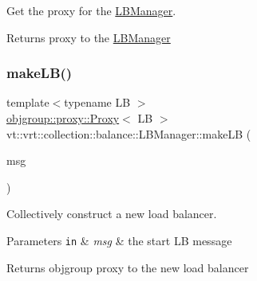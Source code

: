 Get the proxy for the \hyperlink{structvt_1_1vrt_1_1collection_1_1balance_1_1_l_b_manager}{L\+B\+Manager}. 

\begin{DoxyReturn}{Returns}
proxy to the {\ttfamily \hyperlink{structvt_1_1vrt_1_1collection_1_1balance_1_1_l_b_manager}{L\+B\+Manager}} 
\end{DoxyReturn}
\mbox{\label{structvt_1_1vrt_1_1collection_1_1balance_1_1_l_b_manager_abccd80f12ce1ced9e22f32f886a9acf6}} 
\subsubsection{\texorpdfstring{make\+L\+B()}{makeLB()}}
{\footnotesize\ttfamily template$<$typename LB $>$ \\
\hyperlink{structvt_1_1objgroup_1_1proxy_1_1_proxy}{objgroup\+::proxy\+::\+Proxy}$<$ LB $>$ vt\+::vrt\+::collection\+::balance\+::\+L\+B\+Manager\+::make\+LB (\begin{DoxyParamCaption}\item[{\hyperlink{namespacevt_ab2b3d506ec8e8d1540aede826d84a239}{Msg\+Shared\+Ptr}$<$ \hyperlink{structvt_1_1vrt_1_1collection_1_1balance_1_1_start_l_b_msg}{Start\+L\+B\+Msg} $>$}]{msg }\end{DoxyParamCaption})\hspace{0.3cm}{\ttfamily [protected]}}



Collectively construct a new load balancer. 


\begin{DoxyParams}[1]{Parameters}
\mbox{\tt in}  & {\em msg} & the start LB message\\
\hline
\end{DoxyParams}
\begin{DoxyReturn}{Returns}
objgroup proxy to the new load balancer 
\end{DoxyReturn}
\mbox{\label{structvt_1_1vrt_1_1collection_1_1balance_1_1_l_b_manager_a8e18e972cf9e8658da9577d45e090698}} 
